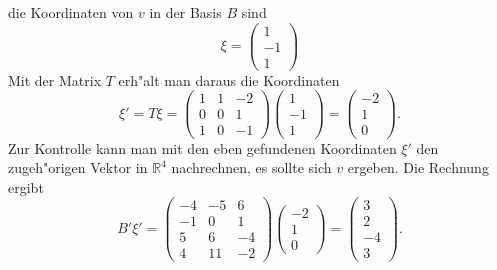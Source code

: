 \begin{loesung}
die Koordinaten von $v$ in der Basis $B$ sind 
\[
\xi
=
\begin{pmatrix}
1\\-1\\1
\end{pmatrix}
\]
Mit der Matrix $T$ erh"alt man daraus die Koordinaten
\[
\xi'=T\xi=
\begin{pmatrix}
1&1&-2\\
0&0& 1\\
1&0&-1
\end{pmatrix}
\begin{pmatrix}
1\\-1\\1
\end{pmatrix}
=
\begin{pmatrix}
-2\\1\\0
\end{pmatrix}.
\]
Zur Kontrolle kann man mit den eben gefundenen Koordinaten $\xi'$ den
zugeh"origen Vektor in $\mathbb R^4$ nachrechnen, es sollte sich $v$
ergeben. Die Rechnung ergibt
\[
B'\xi'=
\begin{pmatrix}
-4&-5& 6\\
-1& 0& 1\\
 5& 6&-4\\
 4&11&-2
\end{pmatrix}
\begin{pmatrix}
-2\\1\\0
\end{pmatrix}
=
\begin{pmatrix}
3\\2\\-4\\3
\end{pmatrix}.
\]
\end{loesung}


